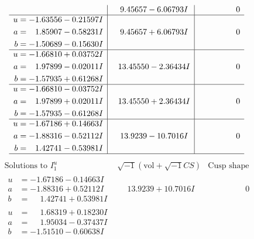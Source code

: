 \documentclass[1p]{elsarticle_modified}
\theoremstyle{definition}
\newcommand{\I}{\sqrt{-1}}
\begin{document}
$$\begin{array}{c|c|c}
 & \phantom{-}9.45657 - 6.06793 I & \phantom{-0.000000 } 0 \\ \hline\begin{aligned}
u &= -1.63556 - 0.21597 I \\
a &= \phantom{-}1.85907 - 0.58231 I \\
b &= -1.50689 - 0.15630 I\end{aligned}
 & \phantom{-}9.45657 + 6.06793 I & \phantom{-0.000000 } 0 \\ \hline\begin{aligned}
u &= -1.66810 + 0.03752 I \\
a &= \phantom{-}1.97899 - 0.02011 I \\
b &= -1.57935 + 0.61268 I\end{aligned}
 & \phantom{-}13.45550 - 2.36434 I & \phantom{-0.000000 } 0 \\ \hline\begin{aligned}
u &= -1.66810 - 0.03752 I \\
a &= \phantom{-}1.97899 + 0.02011 I \\
b &= -1.57935 - 0.61268 I\end{aligned}
 & \phantom{-}13.45550 + 2.36434 I & \phantom{-0.000000 } 0 \\ \hline\begin{aligned}
u &= -1.67186 + 0.14663 I \\
a &= -1.88316 - 0.52112 I \\
b &= \phantom{-}1.42741 - 0.53981 I\end{aligned}
 & \phantom{-}13.9239 - 10.7016 I & \phantom{-0.000000 } 0\\
 \hline 
 \end{array}$$\newpage$$\begin{array}{c|c|c}  
\text{Solutions to }I^u_{1}& \I (\text{vol} + \sqrt{-1}CS) & \text{Cusp shape}\\
 \hline 
\begin{aligned}
u &= -1.67186 - 0.14663 I \\
a &= -1.88316 + 0.52112 I \\
b &= \phantom{-}1.42741 + 0.53981 I\end{aligned}
 & \phantom{-}13.9239 + 10.7016 I & \phantom{-0.000000 } 0 \\ \hline\begin{aligned}
u &= \phantom{-}1.68319 + 0.18230 I \\
a &= \phantom{-}1.95034 - 0.37437 I \\
b &= -1.51510 - 0.60638 I\end{aligned}

\end{array}$$
\end{document}
